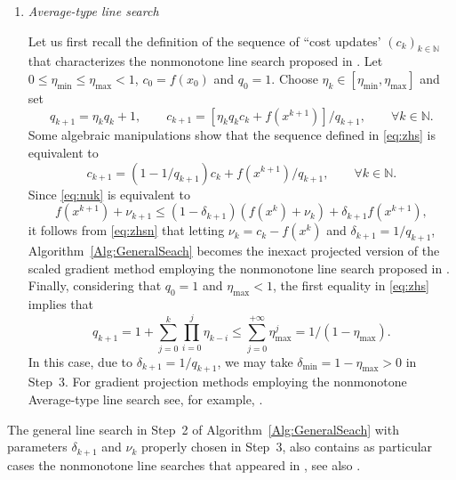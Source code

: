 \begin{enumerate}
	\item {\it Average-type line search}

	      Let us first recall the definition of the sequence of ``cost updates' $(c_k)_{k\in\mathbb{N}}$  that  characterizes the nonmonotone line search proposed in  \cite{ZhangHager2004}. Let   $0\leq \eta_{\min}\leq \eta_{\max}<1$,   $c_0 = f(x_0)$ and  $q_0 = 1$. Choose $\eta_k\in [\eta_{\min},  \eta_{\max}]$ and set
	      \begin{equation} \label{eq:zhs}
		      q_{k+1}=\eta_kq_{k}+1, \qquad c_{k+1} = [\eta_kq_kc_k + f(x^{k+1})]/q_{k+1}, \qquad \forall k \in \mathbb{N}.
	      \end{equation}
	      Some algebraic manipulations show that the sequence defined in   \eqref{eq:zhs} is equivalent to
	      \begin{equation} \label{eq:zhsn}
		      c_{k+1} = (1-1/q_{k+1})c_{k}+f(x^{k+1})/q_{k+1}, \qquad \forall k \in \mathbb{N}.
	      \end{equation}
	      Since \eqref{eq:nuk} is equivalent  to
	      $$
		      f(x^{k+1})+ \nu_{k+1}\leq (1-\delta_{k+1})(f(x^{k})+\nu_{k})+\delta_{k+1}f(x^{k+1}),
	      $$
	      it follows from \eqref{eq:zhsn} that  letting  $\nu_{k}=c_k-f(x^k)$ and $\delta_{k+1}=1/q_{k+1}$, Algorithm~\ref{Alg:GeneralSeach} becomes the  inexact   projected  version of the scaled gradient method employing   the nonmonotone line search proposed in   \cite{ZhangHager2004}.  Finally,  considering that $q_0 = 1$ and  $\eta_{\max}<1$, the  first equality in   \eqref{eq:zhs} implies  that
	      $$
		      q_{k+1}=1+\sum_{j=0}^{k}\prod_{i=0}^{j}\eta_{k-i}\leq \sum_{j=0}^{+\infty} \eta_{\max}^{j}=1/(1-\eta_{\max}).
	      $$
	      In this case, due to $\delta_{k+1}=1/q_{k+1}$, we may take   $\delta_{\min}=1-\eta_{\max}>0$ in  Step~3.  For gradient projection methods employing   the nonmonotone Average-type line search see, for example, \cite{Paulo2007,Schuverdt2019,  Xihong2018}.
\end{enumerate}
\begin{remark}\normalfont \label{rem:outras}
	The general line search in Step~2 of Algorithm~\ref{Alg:GeneralSeach} with  parameters  $\delta_{k+1}$  and  $\nu_{k}$ properly chosen in Step~3, also contains as particular cases the nonmonotone line searches  that appeared in  \cite{Ahookhosh2012,MoLiuYan2007}, see also \cite{GrapigliaSachs2017}.
\end{remark}\normalfont
